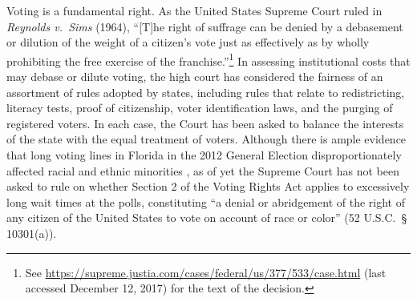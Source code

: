 \documentclass[12pt,titlepage]{article}
\begin{document}
Voting is a fundamental right. As the United States Supreme Court
ruled in \emph{Reynolds v.\ Sims} (1964), ``[T]he right of suffrage
can be denied by a debasement or dilution of the weight of a citizen's
vote just as effectively as by wholly prohibiting the free exercise of
the franchise.''\footnote{See
  \url{https://supreme.justia.com/cases/federal/us/377/533/case.html}
  (last accessed December 12, 2017) for the text of the decision.}  In
assessing institutional costs that may debase or dilute voting, the
high court has considered the fairness of an assortment of rules
adopted by states, including rules that relate to redistricting,
literacy tests, proof of citizenship, voter identification laws, and
the purging of registered voters. In each case, the Court has been
asked to balance the interests of the state with the equal treatment
of voters. Although there is ample evidence that long voting lines in
Florida in the 2012 General Election disproportionately affected
racial and ethnic minorities \citep{herron_smith2014}, as of yet the
Supreme Court has not been asked to rule on whether Section 2 of the
Voting Rights Act applies to excessively long wait times at the polls,
constituting ``a denial or abridgement of the right of any citizen of
the United States to vote on account of race or color'' (52 U.S.C.\ \S
10301(a)).
\end{document}

